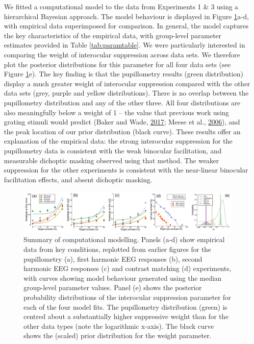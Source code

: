 \documentclass[
]{article}
\begin{document}
We fitted a computational model to the data from Experiments 1 \& 3 using a hierarchical Bayesian approach. The model behaviour is displayed in Figure \ref{fig:modelfigure}a-d, with empirical data superimposed for comparison. In general, the model captures the key characteristics of the empirical data, with group-level parameter estimates provided in Table \ref{tab:paramtable}. We were particularly interested in comparing the weight of interocular suppression across data sets. We therefore plot the posterior distributions for this parameter for all four data sets (see Figure \ref{fig:modelfigure}e). The key finding is that the pupillometry results (green distribution) display a much greater weight of interocular suppression compared with the other data sets (grey, purple and yellow distributions). There is no overlap between the pupillometry distribution and any of the other three. All four distributions are also meaningfully below a weight of 1 -- the value that previous work using grating stimuli would predict (Baker and Wade, \protect\hyperlink{ref-Baker2017}{2017}; Meese et al., \protect\hyperlink{ref-Meese2006}{2006}), and the peak location of our prior distribution (black curve). These results offer an explanation of the empirical data: the strong interocular suppression for the pupillometry data is consistent with the weak binocular facilitation, and measurable dichoptic masking observed using that method. The weaker suppression for the other experiments is consistent with the near-linear binocular facilitation effects, and absent dichoptic masking.

\begin{figure}

{\centering \includegraphics{Figures/modelfigure} 

}

\caption{Summary of computational modelling. Panels (a-d) show empirical data from key conditions, replotted from earlier figures for the pupillometry (a), first harmonic EEG responses (b), second harmonic EEG responses (c) and contrast matching (d) experiments, with curves showing model behaviour generated using the median group-level parameter values.  Panel (e) shows the posterior probability distributions of the interocular suppression parameter for each of the four model fits. The pupillometry distribution (green) is centred about a substantially higher suppressive weight than for the other data types (note the logarithmic x-axis). The black curve shows the (scaled) prior distribution for the weight parameter.}\label{fig:modelfigure}
\end{figure}
\end{document}
